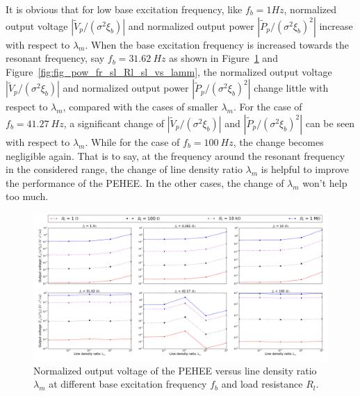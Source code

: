 \documentclass{elsarticle}
\begin{document}
It is obvious that for low base excitation frequency, like $f_b = 1 Hz$, normalized output voltage $|\tilde{V}_p/(\sigma^2 \xi_b)|$ and normalized output power $|\tilde{P}_p/(\sigma^2 \xi_b)^2|$ increase with respect to $\lambda_m$. When the base excitation frequency is increased towards the resonant frequency, say $f_b = 31.62 \ Hz$ as shown in Figure~\ref{fig:fig_vol_fr_sl_Rl_sl_vs_lamm} and Figure~\ref{fig:fig_pow_fr_sl_Rl_sl_vs_lamm}, the normalized output voltage $|\tilde{V}_p/(\sigma^2 \xi_b)|$ and normalized output power $|\tilde{P}_p/(\sigma^2 \xi_b)^2|$ change little with respect to $\lambda_m$, compared with the cases of smaller $\lambda_m$. For the case of $f_b = 41.27 \ Hz$, a significant change of $|\tilde{V}_p/(\sigma^2 \xi_b)|$ and $|\tilde{P}_p/(\sigma^2 \xi_b)^2|$ can be seen with respect to $\lambda_m$. While for the case of $f_b = 100 \ Hz$, the change becomes negligible again. That is to say, at the frequency around the resonant frequency in the considered range, the change of line density ratio $\lambda_m$ is helpful to improve the performance of the PEHEE. In the other cases, the change of $\lambda_m$ won't help too much.

\begin{figure}[!htbp]
    \centering
    \includegraphics[width=\textwidth]{./fig_vol_fr_sl_Rl_sl_vs_lamm}
    \caption{ Normalized output voltage of the PEHEE versus line density ratio $\lambda_m$ at different base excitation frequency $f_b$ and load resistance $R_l$. }
    \label{fig:fig_vol_fr_sl_Rl_sl_vs_lamm}
\end{figure}
\end{document}
